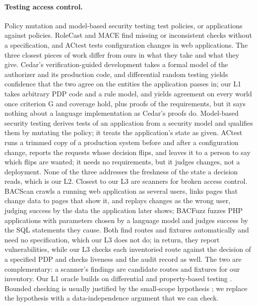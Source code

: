 \documentclass[sigconf,review,anonymous]{acmart}
\begin{document}
\paragraph{Testing access control.} Policy mutation \cite{martin2007mutation} and model-based security testing
\cite{mouelhi2008models} test policies, or applications against policies. RoleCast \cite{son2011rolecast} and
MACE \cite{monshizadeh2014mace} find missing or inconsistent checks without a specification, and ACtest
\cite{xiang2025actest} tests configuration changes in web applications. The three closest pieces of work differ
from ours in what they take and what they give. Cedar's verification-guided development takes a formal model of
the authorizer and its production code, and differential random testing yields confidence that the two agree on
the entities the application passes in; our L1 takes arbitrary PDP code and a rule model, and yields agreement
on every world once criterion G and coverage hold, plus proofs of the requirements, but it says nothing about a
language implementation as Cedar's proofs do. Model-based security testing derives tests of an application from
a security model and qualifies them by mutating the policy; it treats the application's state as given. ACtest
runs a trimmed copy of a production system before and after a configuration change, reports the requests whose
decision flips, and leaves it to a person to say which flips are wanted; it needs no requirements, but it judges
changes, not a deployment. None of the three addresses the freshness of the state a decision reads, which is our
L2. Closest to our L3 are scanners for broken access control. BACScan \cite{liu2025bacscan} crawls a running web
application as several users, links pages that change data to pages that show it, and replays changes as the
wrong user, judging success by the data the application later shows; BACFuzz \cite{dharmaadi2025bacfuzz} fuzzes
PHP applications with parameters chosen by a language model and judges success by the SQL statements they
cause. Both find routes and fixtures automatically and need no specification, which our L3 does not do; in
return, they report vulnerabilities, while our L3 checks each inventoried route against the decision of a
specified PDP and checks liveness and the audit record as well. The two are complementary: a scanner's findings
are candidate routes and fixtures for our inventory. Our L1 oracle builds on differential
and property-based testing \cite{claessen2000quickcheck,maciver2019hypothesis}. Bounded checking is usually
justified by the small-scope hypothesis \cite{jackson2012alloy}; we replace the hypothesis with a
data-independence argument \cite{wolper1986,lazic2003semantic} that we can check.
\end{document}
